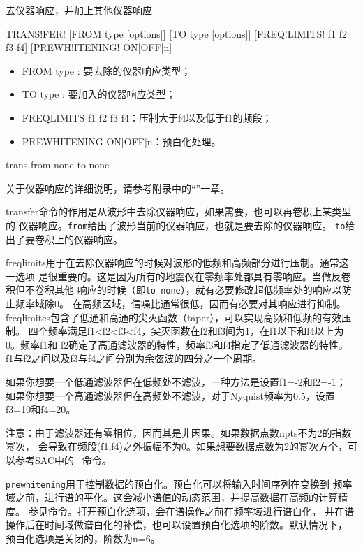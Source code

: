 \label{cmd:transfer}

去仪器响应，并加上其他仪器响应

\begin{SACSTX}
TRANS!FER! [FROM type [options]] [TO type [options]]
    [FREQ!LIMITS! f1 f2 f3 f4] [PREWH!ITENING! ON|OFF|n]
\end{SACSTX}

\begin{itemize}
\item FROM type : 要去除的仪器响应类型；
\item TO type : 要加入的仪器响应类型；
\item FREQLIMITS f1 f2 f3 f4：压制大于f4以及低于f1的频段；
\item PREWHITENING ON|OFF|n：预白化处理。
\end{itemize}

\begin{SACDFT}
trans from none to none
\end{SACDFT}

关于仪器响应的详细说明，请参考附录中的``''一章。

transfer命令的作用是从波形中去除仪器响应，如果需要，也可以再卷积上某类型的
仪器响应。\verb+from+给出了波形当前的仪器响应，也就是要去除的仪器响应。
\verb+to+给出了要卷积上的仪器响应。

freqlimits用于在去除仪器响应的时候对波形的低频和高频部分进行压制。通常这一选项
是很重要的。这是因为所有的地震仪在零频率处都具有零响应。当做反卷积但不卷积其他
响应的时候（即\verb+to none+），就有必要修改超低频率处的响应以防止频率域除0。
在高频区域，信噪比通常很低，因而有必要对其响应进行抑制。
freqlimites包含了低通和高通的尖灭函数（taper），可以实现高频和低频的有效压制。
四个频率满足f1<f2<f3<f4，尖灭函数在f2和f3间为1，在f1以下和f4以上为0。频率f1和
f2确定了高通滤波器的特性，频率f3和f4指定了低通滤波器的特性。
f1与f2之间以及f3与f4之间分别为余弦波的四分之一个周期。

如果你想要一个低通滤波器但在低频处不滤波，一种方法是设置f1=-2和f2=-1；
如果你想要一个高通滤波器但在高频处不滤波，对于Nyquist频率为0.5，设置f3=10和f4=20。

注意：由于滤波器还有零相位，因而其是非因果。如果数据点数npts不为2的指数幂次，
会导致在频段(f1,f4)之外振幅不为0。如果想要数据点数为2的幂次方个，可以参考SAC中的
~命令。

\verb+prewhitening+用于控制数据的预白化。预白化可以将输入时间序列在变换到
频率域之前，进行谱的平化。这会减小谱值的动态范围，并提高数据在高频的计算精度。
参见命令。打开预白化选项，会在谱操作之前在频率域进行谱白化，
并在谱操作后在时间域做谱白化的补偿，也可以设置预白化选项的阶数。默认情况下，
预白化选项是关闭的，阶数为n=6。

